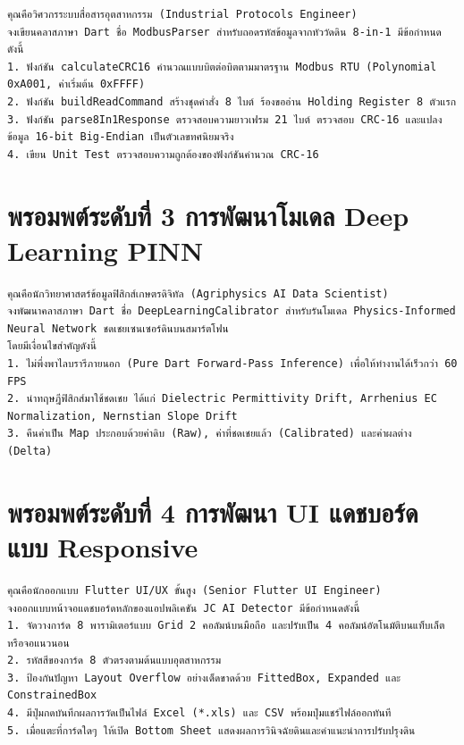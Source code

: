 \begin{promptbox}
\begin{lstlisting}
คุณคือวิศวกรระบบสื่อสารอุตสาหกรรม (Industrial Protocols Engineer)
จงเขียนคลาสภาษา Dart ชื่อ ModbusParser สำหรับถอดรหัสข้อมูลจากหัววัดดิน 8-in-1 มีข้อกำหนดดังนี้
1. ฟังก์ชัน calculateCRC16 คำนวณแบบบิตต่อบิตตามมาตรฐาน Modbus RTU (Polynomial 0xA001, ค่าเริ่มต้น 0xFFFF)
2. ฟังก์ชัน buildReadCommand สร้างชุดคำสั่ง 8 ไบต์ ร้องขออ่าน Holding Register 8 ตัวแรก
3. ฟังก์ชัน parse8In1Response ตรวจสอบความยาวเฟรม 21 ไบต์ ตรวจสอบ CRC-16 และแปลงข้อมูล 16-bit Big-Endian เป็นตัวเลขทศนิยมจริง
4. เขียน Unit Test ตรวจสอบความถูกต้องของฟังก์ชันคำนวณ CRC-16
\end{lstlisting}
\end{promptbox}

\section{พรอมพต์ระดับที่ 3 การพัฒนาโมเดล Deep Learning PINN}

\begin{promptbox}
\begin{lstlisting}
คุณคือนักวิทยาศาสตร์ข้อมูลฟิสิกส์เกษตรดิจิทัล (Agriphysics AI Data Scientist)
จงพัฒนาคลาสภาษา Dart ชื่อ DeepLearningCalibrator สำหรับรันโมเดล Physics-Informed Neural Network ชดเชยเซนเซอร์ดินบนสมาร์ตโฟน
โดยมีเงื่อนไขสำคัญดังนี้
1. ไม่พึ่งพาไลบรารีภายนอก (Pure Dart Forward-Pass Inference) เพื่อให้ทำงานได้เร็วกว่า 60 FPS
2. นำทฤษฎีฟิสิกส์มาใช้ชดเชย ได้แก่ Dielectric Permittivity Drift, Arrhenius EC Normalization, Nernstian Slope Drift
3. คืนค่าเป็น Map ประกอบด้วยค่าดิบ (Raw), ค่าที่ชดเชยแล้ว (Calibrated) และค่าผลต่าง (Delta)
\end{lstlisting}
\end{promptbox}

\section{พรอมพต์ระดับที่ 4 การพัฒนา UI แดชบอร์ดแบบ Responsive}

\begin{promptbox}
\begin{lstlisting}
คุณคือนักออกแบบ Flutter UI/UX ขั้นสูง (Senior Flutter UI Engineer)
จงออกแบบหน้าจอแดชบอร์ดหลักของแอปพลิเคชัน JC AI Detector มีข้อกำหนดดังนี้
1. จัดวางการ์ด 8 พารามิเตอร์แบบ Grid 2 คอลัมน์บนมือถือ และปรับเป็น 4 คอลัมน์อัตโนมัติบนแท็บเล็ตหรือจอแนวนอน
2. รหัสสีของการ์ด 8 ตัวตรงตามต้นแบบอุตสาหกรรม
3. ป้องกันปัญหา Layout Overflow อย่างเด็ดขาดด้วย FittedBox, Expanded และ ConstrainedBox
4. มีปุ่มกดบันทึกผลการวัดเป็นไฟล์ Excel (*.xls) และ CSV พร้อมปุ่มแชร์ไฟล์ออกทันที
5. เมื่อแตะที่การ์ดใดๆ ให้เปิด Bottom Sheet แสดงผลการวินิจฉัยดินและคำแนะนำการปรับปรุงดิน
\end{lstlisting}
\end{promptbox}


